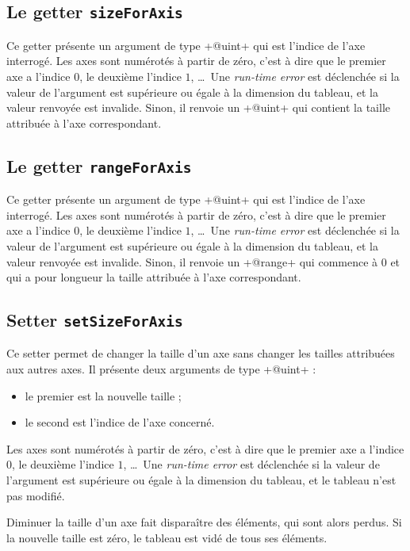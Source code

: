 \subsection{Le getter \texttt{sizeForAxis}}

Ce getter présente un argument de type \ggst+@uint+ qui est l'indice de l'axe interrogé. Les axes sont numérotés à partir de zéro, c'est à dire que le premier axe a l'indice $0$, le deuxième l'indice $1$, \dots~Une \emph{run-time error} est déclenchée si la valeur de l'argument est supérieure ou égale à la dimension du tableau, et la valeur renvoyée est invalide. Sinon, il renvoie un \ggst+@uint+ qui contient la taille attribuée à l'axe correspondant.


\subsection{Le getter \texttt{rangeForAxis}}

Ce getter présente un argument de type \ggst+@uint+ qui est l'indice de l'axe interrogé. Les axes sont numérotés à partir de zéro, c'est à dire que le premier axe a l'indice $0$, le deuxième l'indice $1$, \dots~Une \emph{run-time error} est déclenchée si la valeur de l'argument est supérieure ou égale à la dimension du tableau, et la valeur renvoyée est invalide. Sinon, il renvoie un \ggst+@range+ qui commence à $0$ et qui a pour longueur la taille attribuée à l'axe correspondant.




\subsection{Setter \texttt{setSizeForAxis}}

Ce setter permet de changer la taille d'un axe sans changer les tailles attribuées aux autres axes. Il présente deux arguments de type \ggst+@uint+ :
\begin{itemize}
  \item le premier est la nouvelle taille ;
  \item le second est l'indice de l'axe concerné.
\end{itemize}

Les axes sont numérotés à partir de zéro, c'est à dire que le premier axe a l'indice $0$, le deuxième l'indice $1$, \dots~Une \emph{run-time error} est déclenchée si la valeur de l'argument est supérieure ou égale à la dimension du tableau, et le tableau n'est pas modifié.

Diminuer la taille d'un axe fait disparaître des éléments, qui sont alors perdus. Si la nouvelle taille est zéro, le tableau est vidé de tous ses éléments.

